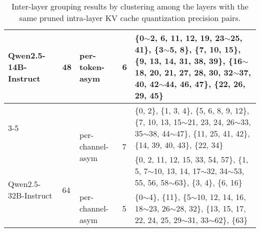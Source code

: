 \begin{table}
{\begin{tabular}{ p{1.5in} p{0.3in} p{1in} p{0.4in} p{4.5in} }
\multirow{4}{*}{Qwen2.5-14B-Instruct} & \multirow{4}{*}{48} & \multirow{2}{*}{per-token-asym} & \multirow{2}{*}{6} & \{0$\sim$2, 6, 11, 12, 19, 23$\sim$25, 41\}, \{3$\sim$5, 8\}, \{7, 10, 15\}, \{9, 13, 14, 31, 38, 39\}, \{16$\sim$18, 20, 21, 27, 28, 30, 32$\sim$37, 40, 42$\sim$44, 46, 47\}, \{22, 26, 29, 45\} \\ \cline{3-5}
& & \multirow{2}{*}{per-channel-asym} & \multirow{2}{*}{7} & \{0, 2\}, \{1, 3, 4\}, \{5, 6, 8, 9, 12\}, \{7, 10, 13, 15$\sim$21, 23, 24, 26$\sim$33, 35$\sim$38, 44$\sim$47\}, \{11, 25, 41, 42\}, \{14, 39, 40, 43\}, \{22, 34\} \\  \hline
\multirow{4}{*}{Qwen2.5-32B-Instruct} & \multirow{4}{*}{64} & \multirow{2}{*}{per-token-asym} & \multirow{2}{*}{4} & \{0, 2, 11, 12, 15, 33, 54, 57\}, \{1, 5, 7$\sim$10, 13, 14, 17$\sim$32, 34$\sim$53, 55, 56, 58$\sim$63\}, \{3, 4\}, \{6, 16\} \\ \cline{3-5}
& & \multirow{2}{*}{per-channel-asym} & \multirow{2}{*}{5} & \{0$\sim$4\}, \{11\}, \{5$\sim$10, 12, 14, 16, 18$\sim$23, 26$\sim$28, 32\}, \{13, 15, 17, 22, 24, 25, 29$\sim$31, 33$\sim$62\}, \{63\} \\ 
\bottomrule
\end{tabular}
}
\caption{Inter-layer grouping results by clustering among the layers with the same pruned intra-layer KV cache quantization precision pairs.}
\label{tab:inter_layer_grouping}
\end{table}

